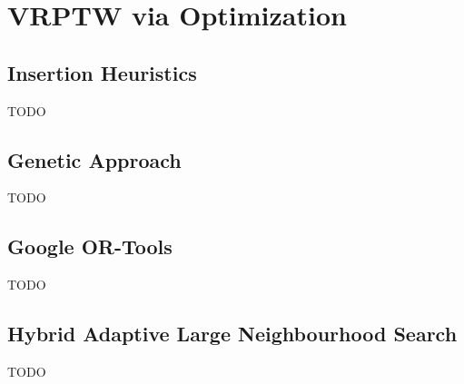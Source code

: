 \chapter{VRPTW via Optimization}
    
\section{Insertion Heuristics}
TODO
    
\section{Genetic Approach}
TODO
        
\section{Google OR-Tools}
TODO
    
\section{Hybrid Adaptive Large Neighbourhood Search}
TODO